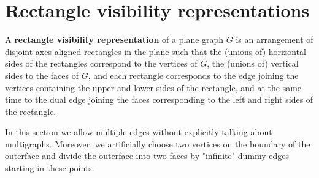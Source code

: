 \section{Rectangle visibility representations}

\begin{defn}
	A \textbf{rectangle visibility representation} of a plane graph $G$ is an arrangement of disjoint axes-aligned rectangles in the plane such that the (unions of) horizontal sides of the rectangles correspond to the vertices of $G$, the (unions of) vertical sides to the faces of $G$, and each rectangle corresponds to the edge joining the vertices containing the upper and lower sides of the rectangle, and at the same time to the dual edge joining the faces corresponding to the left and right sides of the rectangle.
\end{defn}

\begin{comm}
	In this section we allow multiple edges without explicitly talking about \\ multigraphs. Moreover, we artificially choose two vertices on the boundary of the outerface and divide the outerface into two faces by "infinite" dummy edges starting in these points.
\end{comm}

